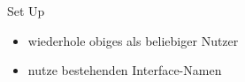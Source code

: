 \documentclass[ngerman,aspectratio=169]{beamer}
\begin{document}
\begin{frame}{Set Up}
{{				\begin{itemize}
					\item wiederhole obiges als beliebiger Nutzer
					\item nutze bestehenden Interface-Namen
				\end{itemize}
			}
		}
	\end{frame}
\end{document}
